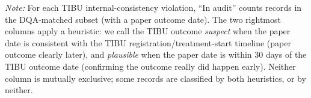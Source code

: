 \newsavebox{\DateTriangleBox}
\begin{minipage}{\wd\DateTriangleBox}
\usebox{\DateTriangleBox}
\par\vspace{4pt}\noindent
\scriptsize{\textit{Note:} For each TIBU internal-consistency violation, ``In audit'' counts records in the DQA-matched subset (with a paper outcome date). The two rightmost columns apply a heuristic: we call the TIBU outcome \emph{suspect} when the paper date is consistent with the TIBU registration/treatment-start timeline (paper outcome clearly later), and \emph{plausible} when the paper date is within 30 days of the TIBU outcome date (confirming the outcome really did happen early). Neither column is mutually exclusive; some records are classified by both heuristics, or by neither.}
\end{minipage}